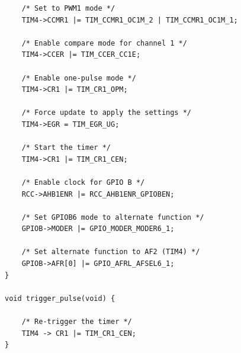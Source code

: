 \documentclass[12pt]{article}
\numberwithin{subsubsubsection}{subsubsection}
\begin{document}
\begin{verbatim}
    /* Set to PWM1 mode */
    TIM4->CCMR1 |= TIM_CCMR1_OC1M_2 | TIM_CCMR1_OC1M_1;
    
    /* Enable compare mode for channel 1 */
    TIM4->CCER |= TIM_CCER_CC1E;

    /* Enable one-pulse mode */
    TIM4->CR1 |= TIM_CR1_OPM;

    /* Force update to apply the settings */
    TIM4->EGR = TIM_EGR_UG;
    
    /* Start the timer */
    TIM4->CR1 |= TIM_CR1_CEN;
    
    /* Enable clock for GPIO B */
    RCC->AHB1ENR |= RCC_AHB1ENR_GPIOBEN;
    
    /* Set GPIOB6 mode to alternate function */
    GPIOB->MODER |= GPIO_MODER_MODER6_1;
    
    /* Set alternate function to AF2 (TIM4) */
    GPIOB->AFR[0] |= GPIO_AFRL_AFSEL6_1;
}

void trigger_pulse(void) {

    /* Re-trigger the timer */
    TIM4 -> CR1 |= TIM_CR1_CEN;
}
\end{verbatim}
\newpage
\end{document}
